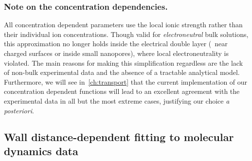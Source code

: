 \subsubsection{Note on the concentration dependencies.}
%

All concentration dependent parameters use the local ionic strength rather than their individual ion
concentrations. Though valid for \emph{electroneutral} bulk solutions, this approximation no longer holds
inside the electrical double layer (\ie~near charged surfaces or inside small nanopores), where local
electroneutrality is violated. The main reasons for making this simplification regardless are the lack of
non-bulk experimental data and the absence of a tractable analytical model. Furthermore, we will see
in~\cref{ch:transport} that the current implementation of our concentration dependent functions will lead to
an excellent agreement with the experimental data in all but the most extreme cases, justifying our choice
\textit{a posteriori}.


%
\subsection[Wall distance-dependent fitting to {MD} data]%
           {Wall distance-dependent fitting to molecular dynamics data}
%

